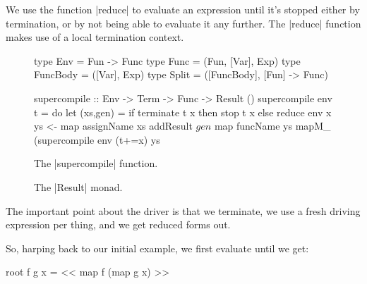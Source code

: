 \documentclass{sigplanconf}
\begin{document}
We use the function |reduce| to evaluate an expression until it's stopped either by termination, or by not being able to evaluate it any further. The |reduce| function makes use of a local termination context.

\begin{figure}
\begin{code}
type Env = Fun -> Func
type Func = (Fun, [Var], Exp)
type FuncBody = ([Var], Exp)
type Split = ([FuncBody], [Fun] -> Func)

supercompile :: Env -> Term -> Func -> Result ()
supercompile env t = do
    let (xs,gen) = if terminate t x then stop t x else reduce env x
    ys <- map assignName xs
    addResult $ gen $ map funcName ys
    mapM_ (supercompile env (t+=x) ys
\end{code}
\caption{The |supercompile| function.}
\label{fig:supercompile}
\end{figure}

\begin{figure}
\caption{The |Result| monad.}
\label{fig:result}
\end{figure}


The important point about the driver is that we terminate, we use a fresh driving expression per thing, and we get reduced forms out.

So, harping back to our initial example, we first evaluate until we get:

\begin{code}
root f g x = << map f (map g x) >>
\end{code}
\end{document}
